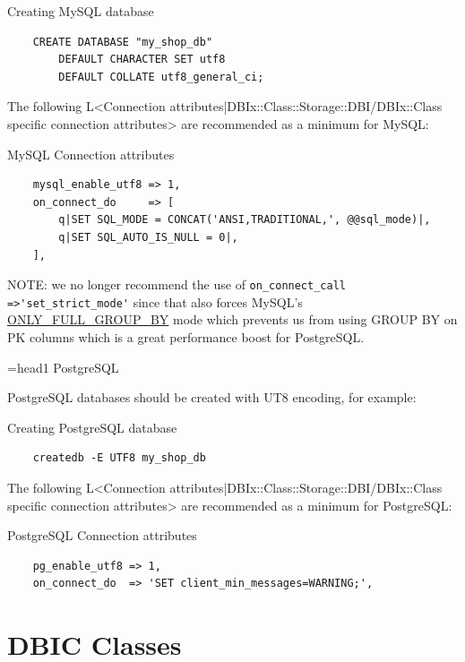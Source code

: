 \begin{frame}[fragile]{Creating MySQL database}
\begin{lstlisting}
    CREATE DATABASE "my_shop_db"
        DEFAULT CHARACTER SET utf8
        DEFAULT COLLATE utf8_general_ci;
\end{lstlisting}
\end{frame}

The following L<Connection attributes|DBIx::Class::Storage::DBI/DBIx::Class specific connection attributes> are recommended as a minimum for MySQL:

\begin{frame}[fragile]{MySQL Connection attributes}
\begin{lstlisting}
    mysql_enable_utf8 => 1,
    on_connect_do     => [
        q|SET SQL_MODE = CONCAT('ANSI,TRADITIONAL,', @@sql_mode)|,
        q|SET SQL_AUTO_IS_NULL = 0|,
    ],
\end{lstlisting}
\end{frame}

NOTE: we no longer recommend the use of 
\verb|on_connect_call =>'set_strict_mode'| since that also forces MySQL's 
\href{https://dev.mysql.com/doc/refman/5.0/en/sql-mode.html#sqlmode\_only\_full\_group\_by}{ONLY\_FULL\_GROUP\_BY} mode which prevents us from using GROUP BY on PK columns which is a great performance boost for PostgreSQL.

=head1 PostgreSQL

PostgreSQL databases should be created with UT8 encoding, for example:

\begin{frame}[fragile]{Creating PostgreSQL database}
\begin{lstlisting}
    createdb -E UTF8 my_shop_db
\end{lstlisting}
\end{frame}

The following L<Connection attributes|DBIx::Class::Storage::DBI/DBIx::Class specific connection attributes> are recommended as a minimum for PostgreSQL:

\begin{frame}[fragile]{PostgreSQL Connection attributes}
\begin{lstlisting}
    pg_enable_utf8 => 1,
    on_connect_do  => 'SET client_min_messages=WARNING;',
\end{lstlisting}
\end{frame}

\section{DBIC Classes}

